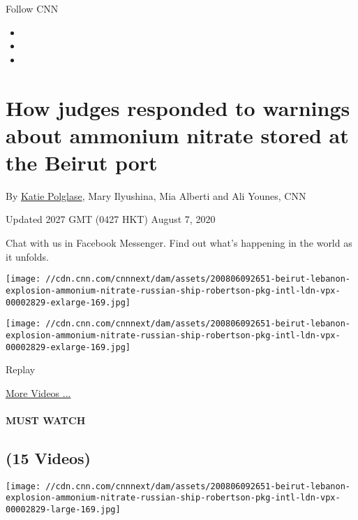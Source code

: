Follow CNN

\begin{itemize}
\item
\item
\item
\end{itemize}

\hypertarget{how-judges-responded-to-warnings-about-ammonium-nitrate-stored-at-the-beirut-port}{%
\section{How judges responded to warnings about ammonium nitrate stored
at the Beirut
port}\label{how-judges-responded-to-warnings-about-ammonium-nitrate-stored-at-the-beirut-port}}

By \href{/profiles/katie-polglase}{Katie Polglase}, Mary Ilyushina, Mia
Alberti and Ali Younes, CNN

Updated 2027 GMT (0427 HKT) August 7, 2020

Chat with us in Facebook Messenger. Find out what's happening in the
world as it unfolds.

\texttt{[image: //cdn.cnn.com/cnnnext/dam/assets/200806092651-beirut-lebanon-explosion-ammonium-nitrate-russian-ship-robertson-pkg-intl-ldn-vpx-00002829-exlarge-169.jpg]}

\texttt{[image: //cdn.cnn.com/cnnnext/dam/assets/200806092651-beirut-lebanon-explosion-ammonium-nitrate-russian-ship-robertson-pkg-intl-ldn-vpx-00002829-exlarge-169.jpg]}\href{javascript:void(0);}{}

Replay

\href{/videos}{More Videos ...}

\hypertarget{must-watch}{%
\paragraph{MUST WATCH}\label{must-watch}}

\hypertarget{15-videos}{%
\subsection{(15 Videos)}\label{15-videos}}

\href{/videos/world/2020/08/06/beirut-lebanon-explosion-ammonium-nitrate-russian-ship-robertson-pkg-intl-ldn-vpx.cnn/video/playlists/around-the-world/}{}

\texttt{[image: //cdn.cnn.com/cnnnext/dam/assets/200806092651-beirut-lebanon-explosion-ammonium-nitrate-russian-ship-robertson-pkg-intl-ldn-vpx-00002829-large-169.jpg]}

